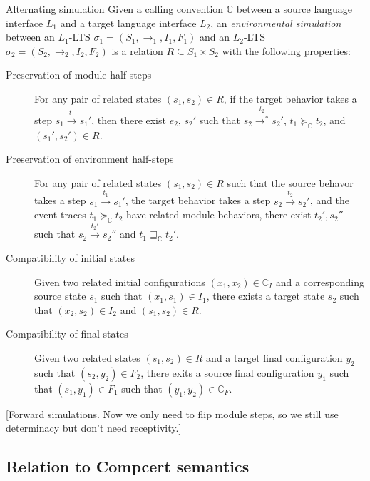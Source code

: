 \documentclass[sigplan,10pt,review,anonymous]{acmart}
\begin{document}
\begin{definition}{Alternating simulation}
Given a calling convention $\mathbb{C}$ between
a source language interface $L_1$ and
a target language interface $L_2$,
an \emph{environmental simulation} between
an $L_1$-LTS $\sigma_1 = (S_1, \rightarrow_1, I_1, F_1)$ and
an $L_2$-LTS $\sigma_2 = (S_2, \rightarrow_2, I_2, F_2)$
is a relation $R \subseteq S_1 \times S_2$
with the following properties:
\begin{description}
\item[Preservation of module half-steps]
  For any pair of related states $(s_1, s_2) \in R$,
  if the target behavior takes a step $s_1 \stackrel{t_1}{\rightarrow} s_1'$,
  then there exist $e_2$, $s_2'$ such that
  $s_2 \stackrel{t_2}{\rightarrow^*} s_2'$,
  $t_1 \succeq_\mathbb{C} t_2$, and
  $(s_1', s_2') \in R$.
\item[Preservation of environment half-steps]
  For any pair of related states $(s_1, s_2) \in R$ such that
  the source behavor takes a step
  $s_1 \stackrel{t_1}{\rightarrow} s_1'$,
  the target behavior takes a step
  $s_2 \stackrel{t_2}{\rightarrow} s_2'$, and
  the event traces
  $t_1 \succeq_\mathbb{C} t_2$ have related module behaviors,
  there exist $t_2', s_2''$ such that
  $s_2 \stackrel{t_2'}{\rightarrow} s_2''$
  and $t_1 \sqsupseteq_\mathbb{C} t_2'$.
\item[Compatibility of initial states]
  Given two related initial configurations $(x_1, x_2) \in \mathbb{C}_I$
  and a corresponding source state $s_1$ such that $(x_1, s_1) \in I_1$,
  there exists a target state $s_2$ such that $(x_2, s_2) \in I_2$ and $(s_1, s_2) \in R$.
\item[Compatibility of final states]
  Given two related states $(s_1, s_2) \in R$ and
  a target final configuration $y_2$ such that $(s_2, y_2) \in F_2$,
  there exits
  a source final configuration $y_1$ such that $(s_1, y_1) \in F_1$
  such that $(y_1, y_2) \in \mathbb{C}_F$.
\end{description}
\end{definition}

[Forward simulations.
Now we only need to flip module steps,
so we still use determinacy but don't need receptivity.]


\subsection{Relation to Compcert semantics} %
\end{document}
